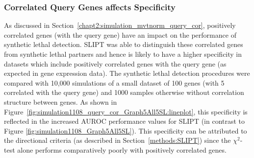     
\subsubsection{Correlated Query Genes affects Specificity}
\label{chapt5:compare_chisq_query_cor}


   
As discussed in Section~\ref{chapt2:simulation_mvtnorm_query_cor}, positively correlated genes (with the query gene) have an impact on the performance of \gls{synthetic lethal} detection. \gls{SLIPT} was able to distinguish these correlated genes from \gls{synthetic lethal} partners and hence is likely to have a higher specificity in datasets which include positively correlated genes with the query gene (as expected in \gls{gene expression} data). The \gls{synthetic lethal} detection procedures were compared with 10,000 simulations of a small dataset of 100 genes (with 5 correlated with the query gene) and 1000 samples otherwise without correlation structure between genes. As shown in Figure~\ref{fig:simulation1108_query_cor_Graph5All5SL:lineplot}, this specificity is reflected in the increased \gls{AUROC} performance values for \gls{SLIPT} (in contrast to Figure \ref{fig:simulation1108_Graph5All5SL}). This specificity can be attributed to the directional criteria (as described in Section~\ref{methods:SLIPT}) since the $\chi^2$-test alone performs comparatively poorly with positively correlated genes.

